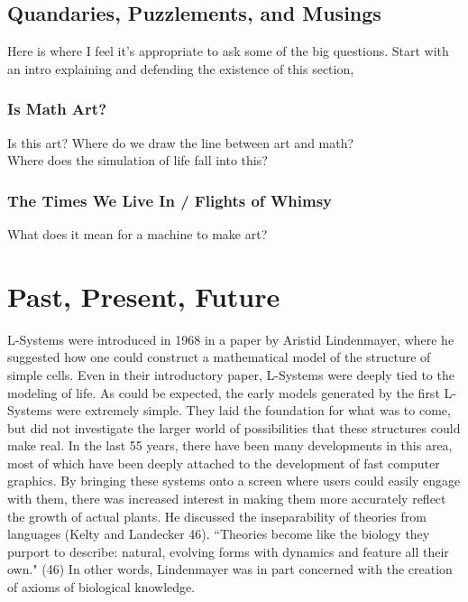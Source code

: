 \documentclass[12pt,twoside]{reedthesis}
\begin{document}
\section{Quandaries, Puzzlements, and Musings}
Here is where I feel it's appropriate to ask some of the big questions. Start with an intro explaining and defending the existence of this section,\\
\subsection{Is Math Art?}
Is this art? Where do we draw the line between art and math?\\
Where does the simulation of life fall into this?
\subsection{The Times We Live In / Flights of Whimsy}
What does it mean for a machine to make art?\\



\chapter{Past, Present, Future}

	L-Systems were introduced in 1968 in a paper by Aristid Lindenmayer, where he suggested how one could construct a mathematical model of the structure of simple cells. Even in their introductory paper, L-Systems were deeply tied to the modeling of life. As could be expected, the early models generated by the first L-Systems were extremely simple. They laid the foundation for what was to come, but did not investigate the larger world of possibilities that these structures could make real. In the last 55 years, there have been many developments in this area, most of which have been deeply attached to the development of fast computer graphics. By bringing these systems onto a screen where users could easily engage with them, there was increased interest in making them more accurately reflect the growth of actual plants. He discussed the inseparability of theories from languages (Kelty and Landecker 46). ``Theories become like the biology they purport to describe: natural, evolving forms with dynamics and feature all their own." (46) In other words, Lindenmayer was in part concerned with the creation of axioms of biological knowledge.\\
	
\end{document}

